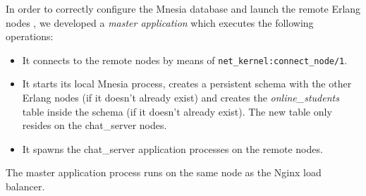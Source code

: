 In order to correctly configure the Mnesia database and launch the remote Erlang nodes , we developed a \textit{master application} which executes the following operations:
\begin{itemize}
    \item It connects to the remote nodes by means of \texttt{net\_kernel:connect\_node/1}.
    
    \item It starts its local Mnesia process, creates a persistent schema with the other Erlang nodes (if it doesn't already exist) and creates the \textit{online\_students} table inside the schema (if it doesn't already exist). The new table only resides on the chat\_server nodes.
    
    \item It spawns the chat\_server application processes on the remote nodes.
\end{itemize}

The master application process runs on the same node as the Nginx load balancer.
